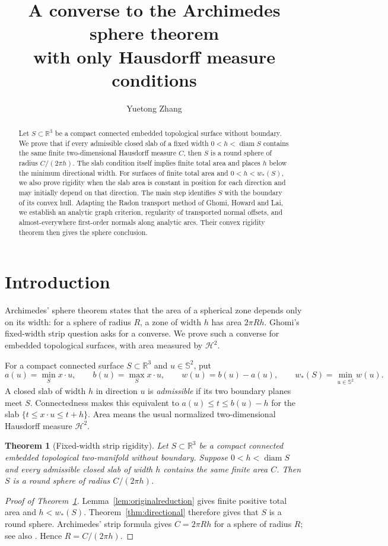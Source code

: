 \documentclass[11pt]{article}
\title{A converse to the Archimedes sphere theorem\\
with only Hausdorff measure conditions}
\author{Yuetong Zhang}
\date{}
\newtheorem{theorem}{Theorem}[section]
\newcommand{\R}{\mathbb R}
\newcommand{\Sph}{\mathbb S}
\newcommand{\HH}{\mathcal H}
\newcommand{\diam}{\operatorname{diam}}
\begin{document}
\maketitle
\begin{abstract}
Let $S\subset\R^3$ be a compact connected embedded topological surface without boundary. We prove that if every admissible closed slab of a fixed width $0<h<\diam S$ contains the same finite two-dimensional Hausdorff measure $C$, then $S$ is a round sphere of radius $C/(2\pi h)$. The slab condition itself implies finite total area and places $h$ below the minimum directional width. For surfaces of finite total area and $0<h<w_*(S)$, we also prove rigidity when the slab area is constant in position for each direction and may initially depend on that direction. The main step identifies $S$ with the boundary of its convex hull. Adapting the Radon transport method of Ghomi, Howard and Lai, we establish an analytic graph criterion, regularity of transported normal offsets, and almost-everywhere first-order normals along analytic arcs. Their convex rigidity theorem then gives the sphere conclusion.
\end{abstract}

\section{Introduction}\label{sec:intro}
Archimedes' sphere theorem states that the area of a spherical zone depends only on its width: for a sphere of radius $R$, a zone of width $h$ has area $2\pi Rh$. Ghomi's fixed-width strip question \cite[Problem 4.3]{Ghomi} asks for a converse. We prove such a converse for embedded topological surfaces, with area measured by $\HH^2$.

For a compact connected surface $S\subset\R^3$ and $u\in\Sph^2$, put
\[
 a(u)=\min_S x\cdot u,\qquad b(u)=\max_S x\cdot u,\qquad
 w(u)=b(u)-a(u),\qquad w_*(S)=\min_{u\in\Sph^2}w(u).
\]
A closed slab of width $h$ in direction $u$ is \emph{admissible} if its two boundary planes meet $S$. Connectedness makes this equivalent to $a(u)\le t\le b(u)-h$ for the slab $\{t\le x\cdot u\le t+h\}$. Area means the usual normalized two-dimensional Hausdorff measure $\HH^2$.

\begin{theorem}[Fixed-width strip rigidity]\label{thm:main}
Let $S\subset\R^3$ be a compact connected embedded topological two-manifold without boundary. Suppose $0<h<\diam S$ and every admissible closed slab of width $h$ contains the same finite area $C$. Then $S$ is a round sphere of radius $C/(2\pi h)$.
\end{theorem}
\begin{proof}[Proof of Theorem~\ref{thm:main}]
Lemma~\ref{lem:originalreduction} gives finite positive total area and $h<w_*(S)$. Theorem~\ref{thm:directional} therefore gives that $S$ is a round sphere. Archimedes' strip formula gives $C=2\pi Rh$ for a sphere of radius $R$; see also \cite[Introduction]{GHL}. Hence $R=C/(2\pi h)$.
\end{proof}
\end{document}
